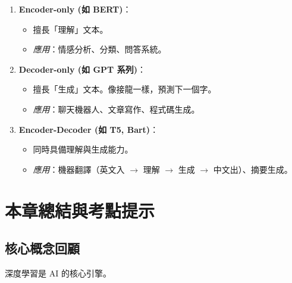 \documentclass[
  letterpaper,
  DIV=11,
  numbers=noendperiod]{scrreprt}
\providecommand{\tightlist}{%
  \setlength{\itemsep}{0pt}\setlength{\parskip}{0pt}}
\begin{document}
\begin{enumerate}
\def\labelenumi{\arabic{enumi}.}
\tightlist
\item
  \textbf{Encoder-only (如 BERT)}：

  \begin{itemize}
  \tightlist
  \item
    擅長「理解」文本。
  \item
    \emph{應用}：情感分析、分類、問答系統。
  \end{itemize}
\item
  \textbf{Decoder-only (如 GPT 系列)}：

  \begin{itemize}
  \tightlist
  \item
    擅長「生成」文本。像接龍一樣，預測下一個字。
  \item
    \emph{應用}：聊天機器人、文章寫作、程式碼生成。
  \end{itemize}
\item
  \textbf{Encoder-Decoder (如 T5, Bart)}：

  \begin{itemize}
  \tightlist
  \item
    同時具備理解與生成能力。
  \item
    \emph{應用}：機器翻譯（英文入 \(\to\) 理解 \(\to\) 生成 \(\to\)
    中文出）、摘要生成。
  \end{itemize}
\end{enumerate}

\chapter{本章總結與考點提示}\label{chap-chapter7-summary}

\section{核心概念回顧}\label{ux6838ux5fc3ux6982ux5ff5ux56deux9867-6}

深度學習是 AI 的核心引擎。
\end{document}
